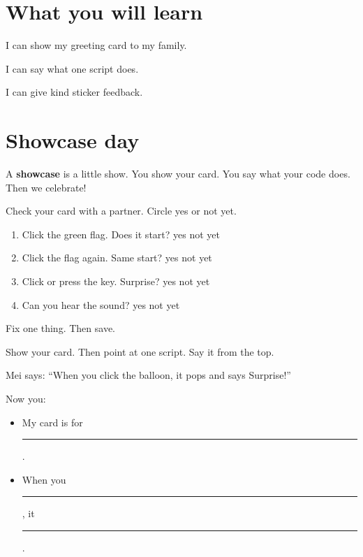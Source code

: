 
\section{What you will learn}
\begin{ican}
  \item I can show my greeting card to my family.
  \item I can say what one script does.
  \item I can give kind sticker feedback.
\end{ican}

\section{Showcase day}
A \textbf{showcase} is a little show. You show your card. You say what your code does. Then we celebrate!

\begin{exercise}
Check your card with a partner. Circle yes or not yet.
\begin{enumerate}[leftmargin=1.4em,itemsep=2pt]
  \item Click the green flag. Does it start? \hfill yes \quad not yet
  \item Click the flag again. Same start? \hfill yes \quad not yet
  \item Click or press the key. Surprise? \hfill yes \quad not yet
  \item Can you hear the sound? \hfill yes \quad not yet
\end{enumerate}
Fix one thing. Then save.
\end{exercise}

\begin{exercise}[My Showcase]
Show your card. Then point at one script. Say it from the top.
\begin{center}
\begin{scratch}[scale=0.85]
\end{scratch}
\end{center}
Mei says: \enquote{When you click the balloon, it pops and says Surprise!}

Now you:
\begin{itemize}[leftmargin=1.4em,itemsep=2pt]
  \item My card is for \rule{4cm}{0.4pt}.
  \item When you \rule{3.5cm}{0.4pt}, it \rule{4cm}{0.4pt}.
\end{itemize}
\end{exercise}

